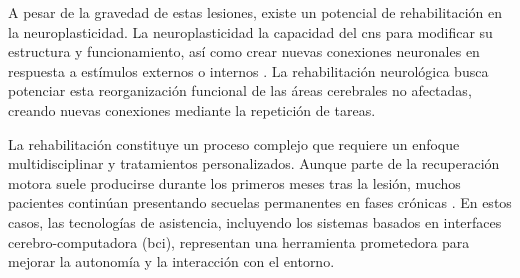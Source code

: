 A pesar de la gravedad de estas lesiones, existe un potencial de rehabilitación en la neuroplasticidad. La neuroplasticidad la capacidad del \acrshort{cns} para modificar su estructura y funcionamiento, así como crear nuevas conexiones neuronales en respuesta a estímulos externos o internos \cite{emos_NeuroanatomyUpper2026,puderbaugh_Neuroplasticity2026}. La rehabilitación neurológica busca potenciar esta reorganización funcional de las áreas cerebrales no afectadas\cite{dipalma_FrontiersNeurorehabilitation2025}, creando nuevas conexiones mediante la repetición de tareas.

La rehabilitación constituye un proceso complejo que requiere un enfoque multidisciplinar y tratamientos personalizados. Aunque parte de la recuperación motora suele producirse durante los primeros meses tras la lesión, muchos pacientes continúan presentando secuelas permanentes en fases crónicas \cite{gao_RestoringCentral2022}. En estos casos, las tecnologías de asistencia, incluyendo los sistemas basados en interfaces cerebro-computadora (\acrshort{bci}), representan una herramienta prometedora para mejorar la autonomía y la interacción con el entorno.
